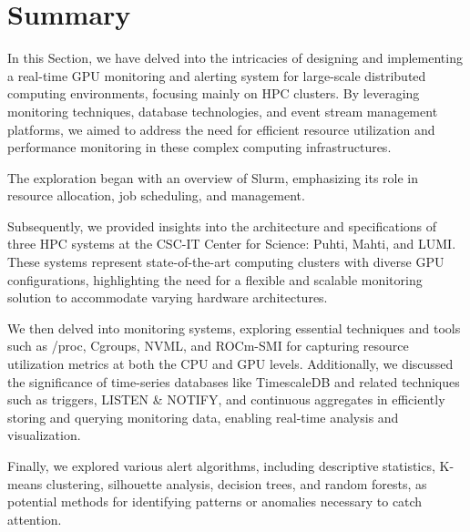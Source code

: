 
\section{Summary}
In this Section, we have delved into the intricacies of designing and implementing a real-time GPU monitoring and alerting system for large-scale distributed computing environments, focusing mainly on HPC clusters. By leveraging monitoring techniques, database technologies, and event stream management platforms, we aimed to address the need for efficient resource utilization and performance monitoring in these complex computing infrastructures.

The exploration began with an overview of Slurm, emphasizing its role in resource allocation, job scheduling, and management.

Subsequently, we provided insights into the architecture and specifications of three HPC systems at the CSC-IT Center for Science: Puhti, Mahti, and LUMI. These systems represent state-of-the-art computing clusters with diverse GPU configurations, highlighting the need for a flexible and scalable monitoring solution to accommodate varying hardware architectures.

We then delved into monitoring systems, exploring essential techniques and tools such as /proc, Cgroups, NVML, and ROCm-SMI for capturing resource utilization metrics at both the CPU and GPU levels. Additionally, we discussed the significance of time-series databases like TimescaleDB and related techniques such as triggers, LISTEN \& NOTIFY, and continuous aggregates in efficiently storing and querying monitoring data, enabling real-time analysis and visualization.


Finally, we explored various alert algorithms, including descriptive statistics, K-means clustering, silhouette analysis, decision trees, and random forests, as potential methods for identifying patterns or anomalies necessary to catch attention.
